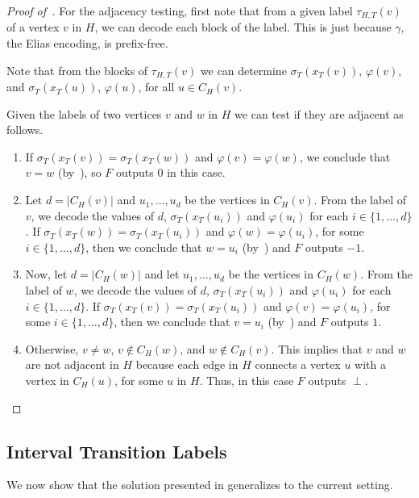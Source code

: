 \documentclass[kpfonts]{patmorin}
\begin{document}
\begin{proof}[Proof of~]
For the adjacency testing, first note that from a given label $\tau_{H,T}(v)$ of a vertex $v$ in $H$, we can decode each block of the label. 
This is just because $\gamma$, the Elias encoding, is prefix-free. 

Note that from the blocks of $\tau_{H,T}(v)$ we can determine $\sigma_T(x_T(v))$, $\varphi(v)$, and 
$\sigma_T(x_T(u))$, $\varphi(u)$, for all $u\in C_H(v)$.

Given the labels of two vertices $v$ and $w$ in $H$ we can test if they are adjacent as follows.
\begin{enumerate}
  \item If $\sigma_T(x_T(v)) = \sigma_T(x_T(w))$ and $\varphi(v)=\varphi(w)$, we conclude that $v=w$ (by~), so $F$ outputs $0$ in this case.

  \item Let $d=|C_H(v)|$ and $u_1,\ldots, u_{d}$ be the vertices in $C_H(v)$. 
  From the label of $v$, 
  we decode the values of $d$, $\sigma_T(x_T(u_i))$ and $\varphi(u_i)$ for each $i\in\{1,\ldots,d\}$.
  If $\sigma_T(x_T(w)) = \sigma_T(x_T(u_i))$ and $\varphi(w)=\varphi(u_i)$, for some $i\in\{1,\ldots,d\}$, then we conclude that $w=u_i$ (by~) and $F$ outputs $-1$.

  \item  Now, let $d=|C_H(w)|$ and let $u_1,\ldots, u_{d}$ be the vertices in $C_H(w)$. 
  From the label of $w$, 
  we decode the values of $d$, $\sigma_T(x_T(u_i))$ and $\varphi(u_i)$ for each $i\in\{1,\ldots,d\}$.
  If $\sigma_T(x_T(v)) = \sigma_T(x_T(u_i))$ and $\varphi(v)=\varphi(u_i)$, for some $i\in\{1,\ldots,d\}$, then we conclude that $v=u_i$ (by~) and $F$ outputs $1$.

  \item Otherwise, $v\neq w$, $v\not\in C_{H}(w)$, and $w\not\in C_{H}(v)$. 
  This implies that $v$ and $w$ are not adjacent in $H$ because each edge in $H$ connects a vertex $u$ with a vertex in $C_H(u)$, for some $u$ in $H$.
  Thus, in this case $F$ outputs $\perp$.
\end{enumerate}
\end{proof}

\subsection{Interval Transition Labels}

We now show that the solution presented in  generalizes to the current setting.
\end{document}
